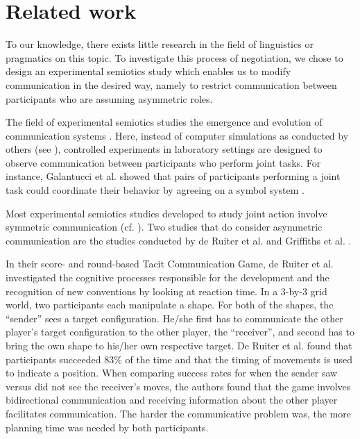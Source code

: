 \section{Related work}


To our knowledge, there exists little research in the field of linguistics or pragmatics on this topic. To investigate this process of negotiation, we chose to design an experimental semiotics study which enables us to modify communication in the desired way, namely to restrict communication between participants who are assuming asymmetric roles.

The field of experimental semiotics studies the emergence and evolution of communication systems \cite{galantucci2009experimental}. Here, instead of computer simulations as conducted by others (see \cite{cangelosi2002simulating,steels2012experiments}), controlled experiments in laboratory settings are designed to observe communication between participants who perform joint tasks. For instance, Galantucci et al. showed that pairs of participants performing a joint task could coordinate their behavior by agreeing on a symbol system \cite{galantucci2005experimental}.

Most experimental semiotics studies developed to study joint action involve symmetric communication (cf. \cite{Galantucci2011experimental}).
Two studies that do consider asymmetric communication are the studies conducted by de Ruiter et al. \cite{de2010exploring} and Griffiths et al. \cite{griffiths2012bottom}. 

In their score- and round-based Tacit Communication Game, de Ruiter et al. investigated the cognitive processes responsible for the development and the recognition of new conventions by looking at reaction time. In a 3-by-3 grid world, two participants each manipulate a shape. For both of the shapes, the ``sender'' sees a target configuration. He/she first has to communicate the other player's target configuration to the other player, the ``receiver'', and second has to bring the own shape to his/her own respective target. De Ruiter et al. found that participants succeeded $83\%$ of the time and that the timing of movements is used to indicate a position. When comparing success rates for when the sender saw versus did not see the receiver's moves, the authors found that the game involves bidirectional communication and receiving information about the other player facilitates communication. The harder the communicative problem was, the more planning time was needed by both participants.

